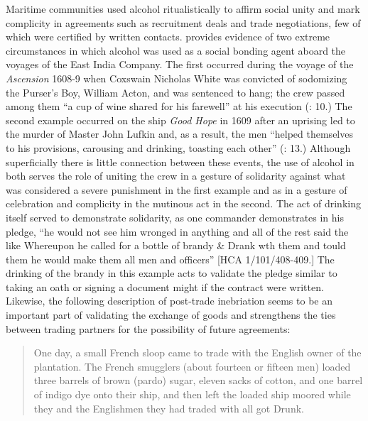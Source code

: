   Maritime communities used alcohol ritualistically to affirm social unity and mark complicity in agreements such as recruitment deals and trade negotiations, few of which were certified by written contacts. \citet{Fury2015} provides evidence of two extreme circumstances in which alcohol was used as a social bonding agent aboard the voyages of the East India Company. The first occurred during the voyage of the \textit{Ascension} 1608-9 when Coxswain Nicholas White was convicted of sodomizing the Purser’s Boy, William Acton, and was sentenced to hang; the crew passed among them “a cup of wine shared for his farewell” at his execution (\citealt{Fury2015}: 10.) The second example occurred on the ship \textit{Good Hope} in 1609 after an uprising led to the murder of Master John Lufkin and, as a result, the men “helped themselves to his provisions, carousing and drinking, toasting each other” (\citealt{Fury2015}: 13.) Although superficially there is little connection between these events, the use of alcohol in both serves the role of uniting the crew in a gesture of solidarity against what was considered a severe punishment in the first example and as in a gesture of celebration and complicity in the mutinous act in the second. The act of drinking itself served to demonstrate solidarity, as one commander demonstrates in his pledge, “he would not see him wronged in anything and all of the rest said the like Whereupon he called for a bottle of brandy \& Drank wth them and tould them he would make them all men and officers” [HCA 1/101/408-409.] The drinking of the brandy in this example acts to validate the pledge similar to taking an oath or signing a document might if the contract were written. Likewise, the following description of post-trade inebriation seems to be an important part of validating the exchange of goods and strengthens the ties between trading partners for the possibility of future agreements:

\begin{quotation}
One day, a small French sloop came to trade with the English owner of the plantation.  The French smugglers (about fourteen or fifteen men) loaded three barrels of brown (pardo) sugar, eleven sacks of cotton, and one barrel of indigo dye onto their ship, and then left the loaded ship moored while they and the Englishmen they had traded with all got Drunk. \citep[15]{Hatfield2016} \end{quotation}

